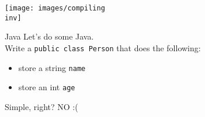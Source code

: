 \documentclass[10pt]{beamer}
\newcommand{\inv}{-inv}
\begin{document}
	\begin{frame}
		\begin{center}
			\texttt{[image: images/compiling\\inv]}
		\end{center}
	\end{frame}


	\begin{frame}[fragile]{Java}
		Let's do some Java.\\
		Write a \texttt{public class Person} that does the following:
		\begin{itemize}
			\item store a string \texttt{name}
			\item store an int \texttt{age}
		\end{itemize}
		Simple, right?
		\vfill\pause
		NO :(
\end{frame}
	
	
\end{document}
